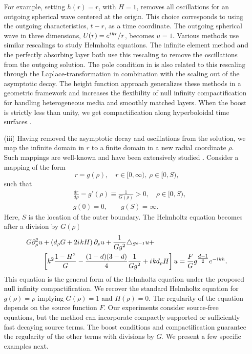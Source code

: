 \documentclass[draft,onefignum,onetabnum]{siamart190516}
\newcommand{\iu}{{i\mkern1mu}}
\begin{document}
For example, setting $h(r)=r$, with $H=1$, removes all oscillations for an outgoing spherical wave centered at the origin. This choice corresponds to using the outgoing characteristics, $t-r$, as a time coordinate. The outgoing spherical wave in three dimensions, $U(r)=e^{\iu k r}/r$, becomes $u=1$. Various methods use similar rescalings to study Helmholtz equations. The infinite element method \cite{demkowicz2006few} and the perfectly absorbing layer \cite{wang2017perfect, yang2021truly} both use this rescaling to remove the oscillations from the outgoing solution. The pole condition in \cite{schmidt2008pole} is also related to this rescaling through the Laplace-transformation in combination with the scaling out of the asymptotic decay. The height function approach generalizes these methods in a geometric framework and increases the flexibility of null infinity compactification for handling heterogeneous media and smoothly matched layers. When the boost is strictly less than unity, we get compactification along hyperboloidal time surfaces \cite{Zenginoglu08}. 

(iii) Having removed the asymptotic decay and oscillations from the solution, we map the infinite domain in $r$ to a finite domain in a new radial coordinate $\rho$. Such mappings are well-known and have been extensively studied \cite{GroschOrszag77, boyd1982optimization, shen2009some, wang2017perfect}. Consider a mapping of the form
\[ r = g(\rho), \quad r\in[0,\infty),\ \rho\in[0,S), \]
such that
\begin{align*}
	 & \frac{dr}{d\rho} = g'(\rho) \equiv \frac{1}{G(\rho)} > 0, \quad \rho\in [0,S), \\
	 & g(0)      = 0, \qquad g(S) = \infty.
\end{align*}
Here, $S$ is the location of the outer boundary. The Helmholtz equation becomes after a division by $G(\rho)$
\begin{align}
	\label{eq:hyp_general}
	G \partial_\rho^2 u & + \left( d_\rho G + 2 \iu k H \right) \partial_\rho u + \frac{1}{G g^2}\triangle_{S^{d-1}} u +  \nonumber                        \\
	               & \left[k^2 \frac{1-H^2}{G} - \frac{(1-d)(3-d)}{4} \frac{1}{G g^2} + \iu k d_\rho H \right] u = \frac{F}{G} g^{\tfrac{d-1}{2}} e^{-\iu k h}.
\end{align}
This equation is the general form of the Helmholtz equation under the proposed null infinity compactification. We recover the standard Helmholtz equation for $g(\rho) = \rho$ implying $G(\rho)=1$ and $H(\rho)=0$. The regularity of the equation depends on the source function $F$. Our experiments consider source-free equations, but the method can incorporate compactly supported or sufficiently fast decaying source terms. The boost conditions and compactification guarantee the regularity of the other terms with divisions by $G$. We present a few specific examples next.
\end{document}
